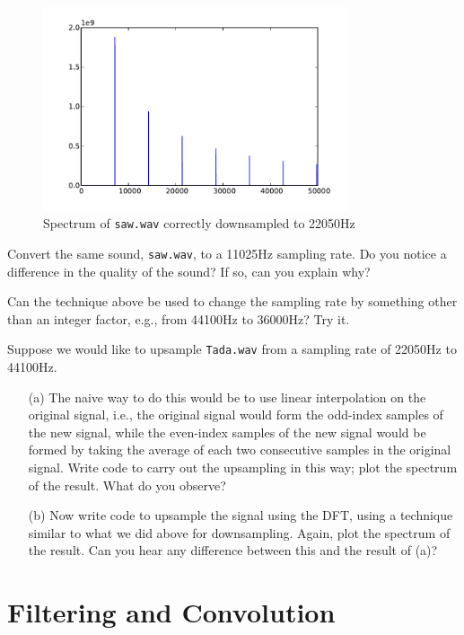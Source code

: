 \begin{figure}[ht]\caption{Spectrum of \texttt{saw.wav} correctly downsampled to 22050Hz}\label{sawspecdown2}\centering\includegraphics[width=90mm]{sawdownspec}\end{figure}

\begin{problem}
Convert the same sound, \texttt{saw.wav}, to a 11025Hz sampling rate. Do you notice a difference in the quality of the sound? If so, can you explain why?
\end{problem}

\begin{problem}
Can the technique above be used to change the sampling rate by something other than an integer factor, e.g., from 44100Hz to 36000Hz? Try it.
\end{problem}

\begin{problem}
Suppose we would like to upsample \texttt{Tada.wav} from a sampling rate of 22050Hz to 44100Hz. \begin{enumerate}
\item[(a)]
The naive way to do this would be to use linear interpolation on the original signal, i.e., the original signal would form the odd-index samples of the new signal, while the even-index samples of the new signal would be formed by taking the average of each two consecutive samples in the original signal. Write code to carry out the upsampling in this way; plot the spectrum of the result. What do you observe?
\item[(b)]Now write code to upsample the signal using the DFT, using a technique similar to what we did above for downsampling. Again, plot the spectrum of the result. Can you hear any difference between this and the result of (a)?
\end{enumerate}
\end{problem}

\section*{Filtering and Convolution}

